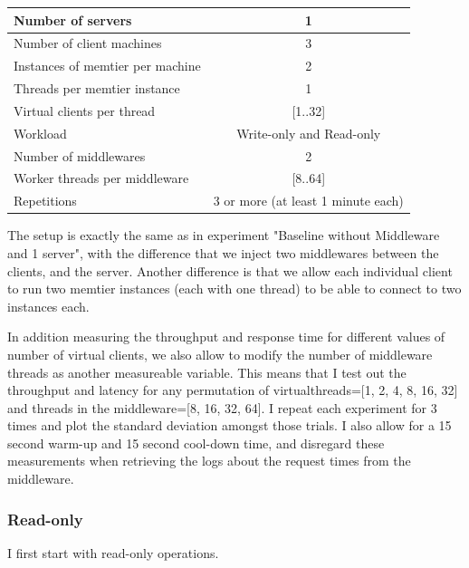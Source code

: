 \documentclass[11pt,a4paper]{article}
\begin{document}
\begin{center}
	\scriptsize{
		\begin{tabular}{|l|c|}
			\hline Number of servers                & 1                        \\ 
			\hline Number of client machines        & 3                        \\ 
			\hline Instances of memtier per machine & 2                        \\ 
			\hline Threads per memtier instance     & 1                        \\
			\hline Virtual clients per thread       & [1..32]                  \\ 
			\hline Workload                         & Write-only and Read-only \\
			\hline Number of middlewares            & 2                        \\
			\hline Worker threads per middleware    & [8..64]                  \\
			\hline Repetitions                      & 3 or more (at least 1 minute each)                \\ 
			\hline 
		\end{tabular}
	} 
\end{center}

The setup is exactly the same as in experiment "Baseline without Middleware and 1 server", with the difference that we inject two middlewares between the clients, and the server.
Another difference is that we allow each individual client to run two memtier instances (each with one thread) to be able to connect to two instances each.

In addition measuring the throughput and response time for different values of number of virtual clients, we also allow to modify the number of middleware threads as another measureable variable.
This means that I test out the throughput and latency for any permutation of
virtualthreads=[1, 2, 4, 8, 16, 32] and threads in the middleware=[8, 16, 32, 64].
I repeat each experiment for 3 times and plot the standard deviation amongst those trials.
I also allow for a 15 second warm-up and 15 second cool-down time, and disregard these measurements when retrieving the logs about the request times from the middleware.\\

\subsubsection{Read-only}
I first start with read-only operations.
\end{document}

